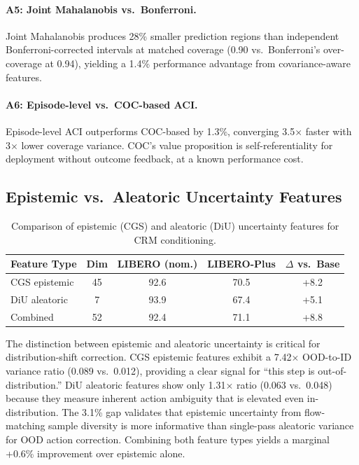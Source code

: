 \documentclass[letterpaper]{article}
\begin{document}
\paragraph{A5: Joint Mahalanobis vs.\ Bonferroni.}
Joint Mahalanobis produces 28\% smaller prediction regions than independent Bonferroni-corrected intervals at matched coverage (0.90 vs.\ Bonferroni's over-coverage at 0.94), yielding a 1.4\% performance advantage from covariance-aware features.

\paragraph{A6: Episode-level vs.\ COC-based ACI.}
Episode-level ACI outperforms COC-based by 1.3\%, converging 3.5$\times$ faster with 3$\times$ lower coverage variance.
COC's value proposition is self-referentiality for deployment without outcome feedback, at a known performance cost.

\subsection{Epistemic vs.\ Aleatoric Uncertainty Features}
\label{sec:epistemic}

\begin{table}[h]
\centering
\caption{Comparison of epistemic (CGS) and aleatoric (DiU) uncertainty features for CRM conditioning.}
\label{tab:epistemic}
\begin{tabular}{lcccc}
\toprule
Feature Type & Dim & LIBERO (nom.) & LIBERO-Plus & $\Delta$ vs.\ Base \\
\midrule
CGS epistemic & 45 & 92.6 & 70.5 & +8.2 \\
DiU aleatoric & 7 & 93.9 & 67.4 & +5.1 \\
Combined & 52 & 92.4 & 71.1 & +8.8 \\
\bottomrule
\end{tabular}
\end{table}

The distinction between epistemic and aleatoric uncertainty is critical for distribution-shift correction.
CGS epistemic features exhibit a 7.42$\times$ OOD-to-ID variance ratio (0.089 vs.\ 0.012), providing a clear signal for ``this step is out-of-distribution.''
DiU aleatoric features show only 1.31$\times$ ratio (0.063 vs.\ 0.048) because they measure inherent action ambiguity that is elevated even in-distribution.
The 3.1\% gap validates that epistemic uncertainty from flow-matching sample diversity is more informative than single-pass aleatoric variance for OOD action correction.
Combining both feature types yields a marginal +0.6\% improvement over epistemic alone.
\end{document}
